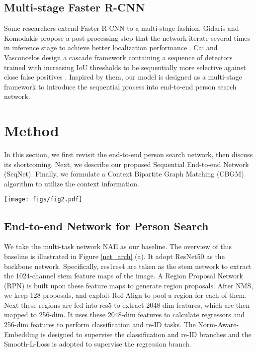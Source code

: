 \documentclass[letterpaper]{article} \usepackage{aaai21}  \usepackage{times}  \usepackage{helvet} \usepackage{courier}  \usepackage[hyphens]{url}  \usepackage{graphicx} \urlstyle{rm} \def\UrlFont{\rm}  \usepackage{natbib}  \usepackage{caption} \usepackage{multirow}
\begin{document}
\subsection{Multi-stage Faster R-CNN}
Some researchers extend Faster R-CNN to a multi-stage fashion. Gidaris and Komodakis propose a post-processing step that the network iterate several times in inference stage to achieve better localization performance \cite{iterative-bbox1,iterative-bbox2}. Cai and Vasconcelos design a cascade framework containing a sequence of detectors trained with increasing IoU thresholds to be sequentially more selective against close false positives \cite{cascade-rcnn}. Inspired by them, our model is designed as a multi-stage framework to introduce the sequential process into end-to-end person search network.

\section{Method}
In this section, we first revisit the end-to-end person search network, then discuss its shortcoming. Next, we describe our proposed Sequential End-to-end Network (SeqNet). Finally, we formulate a Context Bipartite Graph Matching (CBGM) algorithm to utilize the context information.

\begin{figure*}[t]
    \centering
    \texttt{[image: figs/fig2.pdf]}
    \caption{(a). Baseline (b). Our Sequential End-to-end Network, in which yellow parts are modifications and NMS only be applied in inference stage. The structure before RoI-Align is the same as baseline, so it is not shown here for simplification.}
    \label{net_arch}
\end{figure*}

\subsection{End-to-end Network for Person Search}
We take the multi-task network NAE \cite{nae} as our baseline. The overview of this baseline is illustrated in Figure \ref{net_arch} (a). It adopt ResNet50 \cite{resnet} as the backbone network. Specifically, res1res4 are taken as the stem network to extract the 1024-channel stem feature maps of the image. A Region Proposal Network (RPN) is built upon these feature maps to generate region proposals. After NMS, we keep 128 proposals, and exploit RoI-Align to pool a  region for each of them. Next these regions are fed into res5 to extract 2048-dim features, which are then mapped to 256-dim. It uses these 2048-dim features to calculate regressors and 256-dim features to perform classification and re-ID tasks. The Norm-Aware-Embedding is designed to supervise the classification and re-ID branches and the Smooth-L-Loss \cite{fast-rcnn} is adopted to supervise the regression branch.
\end{document}
